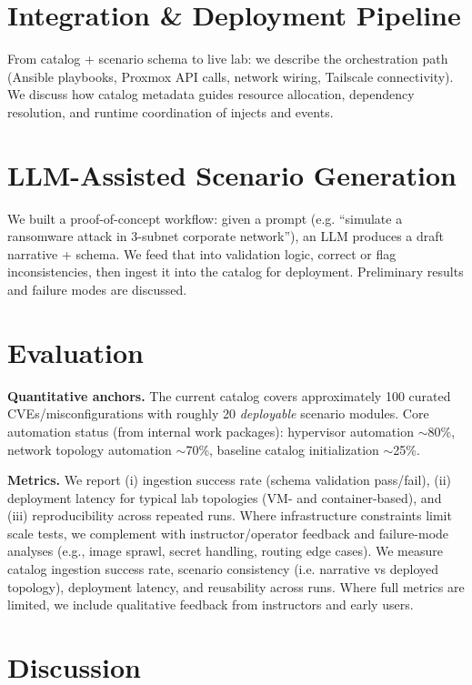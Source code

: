 \documentclass[11pt]{article}
\begin{document}
\section{Integration \& Deployment Pipeline}
From catalog + scenario schema to live lab: we describe the orchestration path (Ansible playbooks, Proxmox API calls, network wiring, Tailscale connectivity). We discuss how catalog metadata guides resource allocation, dependency resolution, and runtime coordination of injects and events.

\section{LLM-Assisted Scenario Generation}
We built a proof-of-concept workflow: given a prompt (e.g. “simulate a ransomware attack in 3-subnet corporate network”), an LLM produces a draft narrative + schema. We feed that into validation logic, correct or flag inconsistencies, then ingest it into the catalog for deployment. Preliminary results and failure modes are discussed.

\section{Evaluation}

\textbf{Quantitative anchors.} The current catalog covers approximately 100 curated CVEs/misconfigurations with roughly 20 \emph{deployable} scenario modules.
Core automation status (from internal work packages): hypervisor automation $\sim$80\%, network topology automation $\sim$70\%, baseline catalog initialization $\sim$25\%.

\textbf{Metrics.} We report (i) ingestion success rate (schema validation pass/fail), (ii) deployment latency for typical lab topologies (VM- and container-based), and (iii) reproducibility across repeated runs.
Where infrastructure constraints limit scale tests, we complement with instructor/operator feedback and failure-mode analyses (e.g., image sprawl, secret handling, routing edge cases).
We measure catalog ingestion success rate, scenario consistency (i.e. narrative vs deployed topology), deployment latency, and reusability across runs. Where full metrics are limited, we include qualitative feedback from instructors and early users.

\section{Discussion}
\end{document}
